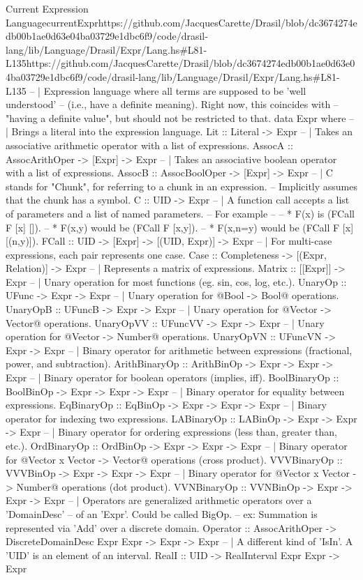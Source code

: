 \begin{haskell}{Current Expression Language}{currentExpr}{https://github.com/JacquesCarette/Drasil/blob/dc3674274edb00b1ae0d63e04ba03729e1db\newline{}c6f9/code/drasil-lang/lib/Language/Drasil/Expr/Lang.hs\#L81-L135}{https://github.com/JacquesCarette/Drasil/blob/dc3674274edb00b1ae0d63e04ba03729e1dbc6f9/code/drasil-lang/lib/Language/Drasil/Expr/Lang.hs\#L81-L135}
-- | Expression language where all terms are supposed to be 'well understood'
--   (i.e., have a definite meaning). Right now, this coincides with
--   "having a definite value", but should not be restricted to that.
data Expr where
  -- | Brings a literal into the expression language.
  Lit :: Literal -> Expr
  -- | Takes an associative arithmetic operator with a list of expressions.
  AssocA   :: AssocArithOper -> [Expr] -> Expr
  -- | Takes an associative boolean operator with a list of expressions.
  AssocB   :: AssocBoolOper  -> [Expr] -> Expr
  -- | C stands for "Chunk", for referring to a chunk in an expression.
  --   Implicitly assumes that the chunk has a symbol.
  C        :: UID -> Expr
  -- | A function call accepts a list of parameters and a list of named parameters.
  --   For example
  --
  --   * F(x) is (FCall F [x] []).
  --   * F(x,y) would be (FCall F [x,y]).
  --   * F(x,n=y) would be (FCall F [x] [(n,y)]).
  FCall    :: UID -> [Expr] -> [(UID, Expr)] -> Expr
  -- | For multi-case expressions, each pair represents one case.
  Case     :: Completeness -> [(Expr, Relation)] -> Expr
  -- | Represents a matrix of expressions.
  Matrix   :: [[Expr]] -> Expr
  -- | Unary operation for most functions (eg. sin, cos, log, etc.).
  UnaryOp       :: UFunc -> Expr -> Expr
  -- | Unary operation for @Bool -> Bool@ operations.
  UnaryOpB      :: UFuncB -> Expr -> Expr
  -- | Unary operation for @Vector -> Vector@ operations.
  UnaryOpVV     :: UFuncVV -> Expr -> Expr
  -- | Unary operation for @Vector -> Number@ operations.
  UnaryOpVN     :: UFuncVN -> Expr -> Expr
  -- | Binary operator for arithmetic between expressions (fractional, power, and subtraction).
  ArithBinaryOp :: ArithBinOp -> Expr -> Expr -> Expr
  -- | Binary operator for boolean operators (implies, iff).
  BoolBinaryOp  :: BoolBinOp -> Expr -> Expr -> Expr
  -- | Binary operator for equality between expressions.
  EqBinaryOp    :: EqBinOp -> Expr -> Expr -> Expr
  -- | Binary operator for indexing two expressions.
  LABinaryOp    :: LABinOp -> Expr -> Expr -> Expr
  -- | Binary operator for ordering expressions (less than, greater than, etc.).
  OrdBinaryOp   :: OrdBinOp -> Expr -> Expr -> Expr
  -- | Binary operator for @Vector x Vector -> Vector@ operations (cross product).
  VVVBinaryOp   :: VVVBinOp -> Expr -> Expr -> Expr
  -- | Binary operator for @Vector x Vector -> Number@ operations (dot product).
  VVNBinaryOp   :: VVNBinOp -> Expr -> Expr -> Expr
  -- | Operators are generalized arithmetic operators over a 'DomainDesc'
  --   of an 'Expr'.  Could be called BigOp.
  --   ex: Summation is represented via 'Add' over a discrete domain.
  Operator :: AssocArithOper -> DiscreteDomainDesc Expr Expr -> Expr -> Expr
  -- | A different kind of 'IsIn'. A 'UID' is an element of an interval.
  RealI    :: UID -> RealInterval Expr Expr -> Expr
\end{haskell}
